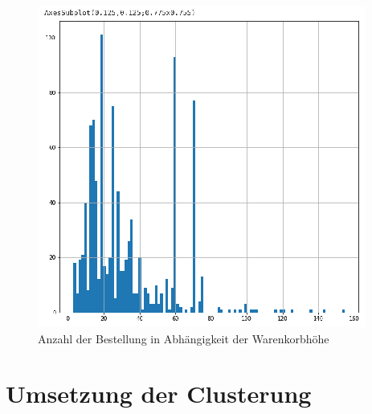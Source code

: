 \begin{figure}[!ht]
	\centering
	\includegraphics[width=\linewidth]{images/chapter4/first_plot.eps}
	\caption{Anzahl der Bestellung in Abhängigkeit der Warenkorbhöhe}
	\label{img:plot_count_amount}
\end{figure}

\section{Umsetzung der Clusterung}
